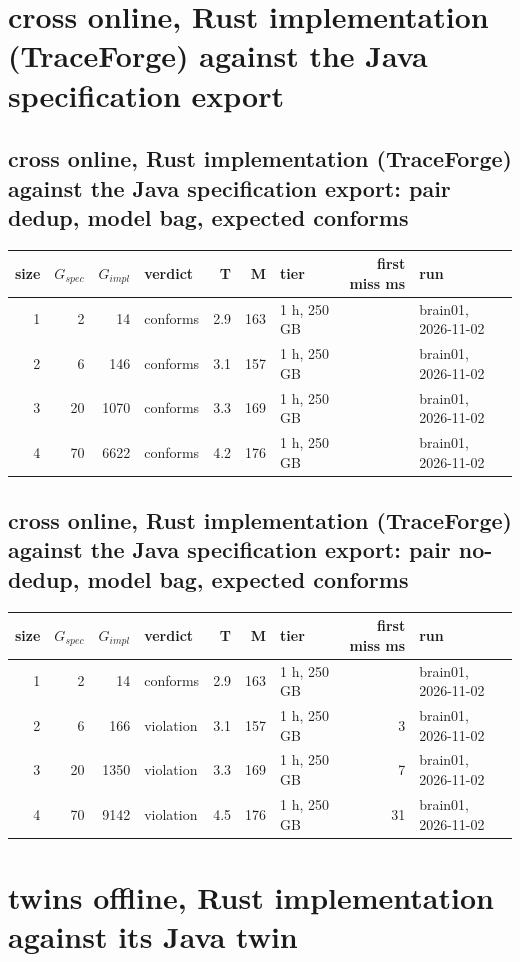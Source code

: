 \documentclass[10pt]{article}
\begin{document}
\section*{cross online, Rust implementation (TraceForge) against the Java specification export}
\subsection*{cross online, Rust implementation (TraceForge) against the Java specification export: pair \textsf{dedup}, model bag, expected conforms}
\begin{longtable}{@{}rrrlrrlrl@{}}
\toprule
size & $G_{\mathit{spec}}$ & $G_{\mathit{impl}}$ & verdict & T & M & tier & first miss ms & run \\
\midrule
\endhead
\color{red} 1 & 2 & 14 & conforms & 2.9 & 163 & 1 h, 250 GB &  & brain01, 2026-11-02 \\
\color{red} 2 & 6 & 146 & conforms & 3.1 & 157 & 1 h, 250 GB &  & brain01, 2026-11-02 \\
\color{red} 3 & 20 & 1070 & conforms & 3.3 & 169 & 1 h, 250 GB &  & brain01, 2026-11-02 \\
\color{red} 4 & 70 & 6622 & conforms & 4.2 & 176 & 1 h, 250 GB &  & brain01, 2026-11-02 \\
\bottomrule
\end{longtable}
\subsection*{cross online, Rust implementation (TraceForge) against the Java specification export: pair \textsf{no-dedup}, model bag, expected conforms}
\begin{longtable}{@{}rrrlrrlrl@{}}
\toprule
size & $G_{\mathit{spec}}$ & $G_{\mathit{impl}}$ & verdict & T & M & tier & first miss ms & run \\
\midrule
\endhead
\color{red} 1 & 2 & 14 & conforms & 2.9 & 163 & 1 h, 250 GB &  & brain01, 2026-11-02 \\
\color{red} 2 & 6 & 166 & violation & 3.1 & 157 & 1 h, 250 GB & 3 & brain01, 2026-11-02 \\
\color{red} 3 & 20 & 1350 & violation & 3.3 & 169 & 1 h, 250 GB & 7 & brain01, 2026-11-02 \\
\color{red} 4 & 70 & 9142 & violation & 4.5 & 176 & 1 h, 250 GB & 31 & brain01, 2026-11-02 \\
\bottomrule
\end{longtable}
\section*{twins offline, Rust implementation against its Java twin}
\end{document}
